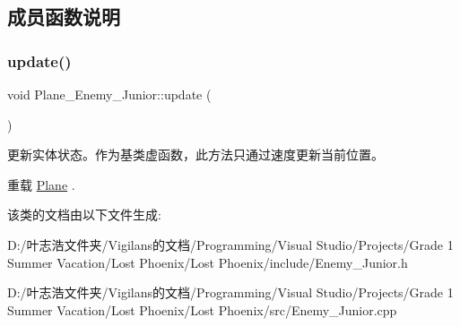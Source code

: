 \subsection{成员函数说明}
\mbox{\label{class_plane___enemy___junior_a686e46c9927793dd07235cac72d52405}} 
\subsubsection{\texorpdfstring{update()}{update()}}
{\footnotesize\ttfamily void Plane\+\_\+\+Enemy\+\_\+\+Junior\+::update (\begin{DoxyParamCaption}{ }\end{DoxyParamCaption})\hspace{0.3cm}{\ttfamily [virtual]}}



更新实体状态。作为基类虚函数，此方法只通过速度更新当前位置。 



重载 \hyperlink{class_plane_a7fbb07f76503fe057772e01f542afc32}{Plane} .



该类的文档由以下文件生成\+:\begin{DoxyCompactItemize}
\item 
D\+:/叶志浩文件夹/\+Vigilans的文档/\+Programming/\+Visual Studio/\+Projects/\+Grade 1 Summer Vacation/\+Lost Phoenix/\+Lost Phoenix/include/Enemy\+\_\+\+Junior.\+h\item 
D\+:/叶志浩文件夹/\+Vigilans的文档/\+Programming/\+Visual Studio/\+Projects/\+Grade 1 Summer Vacation/\+Lost Phoenix/\+Lost Phoenix/src/Enemy\+\_\+\+Junior.\+cpp\end{DoxyCompactItemize}
